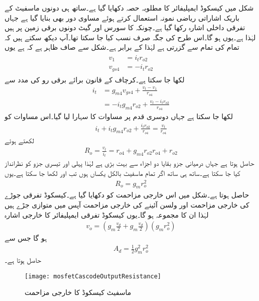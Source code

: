 شکل  میں کیسکوڈ ایمپلیفائر کا مطلوبہ حصہ دکھایا گیا ہے۔ساتھ ہی دونوں ماسفیٹ کے باریک اشاراتی ریاضی نمونہ استعمال کرتے ہوئے مساوی دور بھی بنایا گیا ہے جہاں تفرقی داخلی اشارہ  رکھا گیا ہے۔چونکہ  کا سورس اور گیٹ دونوں برقی زمین پر ہیں لہٰذا  ہے۔یوں  ہو گا۔اس طرح  کی جگہ صرف  نسب کیا جا سکتا تھا۔آپ دیکھ سکتے ہیں کہ  تمام کی تمام  سے گزرتی ہے لہٰذا  کے برابر ہے۔شکل سے صاف ظاہر ہے کہ  ہے یوں
\begin{gather}
\begin{aligned}\label{مساوات_تفرقی_ماسفیٹ_کیسکوڈ_خارجی_مزاحمت}
v_1&=i_t r_{o2}\\
v_{gs4}&=-i_t r_{o2}
\end{aligned}
\end{gather}
لکھا جا سکتا ہے۔کرچاف کے قانون برائے برقی رو کی مدد سے
\begin{align*}
i_t&=g_{m4} v_{gs4}+\frac{v_t-v_1}{r_{o4}}\\
&=-i_t g_{m4} r_{o2}+\frac{v_t-i_t r_{o2}}{r_{o4}}
\end{align*}
لکھا جا سکتا ہے جہاں دوسری قدم پر مساوات  کا سہارا لیا گیا۔اس مساوات کو
\begin{align*}
i_t+i_t g_{m4} r_{o2}+\frac{i_t r_{o2}}{r_{o4}}=\frac{v_t}{r_{o4}}
\end{align*}
لکھتے ہوئے
\begin{align}
R_o=\frac{v_t}{i_t}=r_{o4}+g_{m4} r_{o2} r_{o4}+r_{o2}
\end{align}
حاصل ہوتا ہے جہاں درمیانی جزو بقایا دو اجزاء سے بہت بڑی ہے لہٰذا پہلی اور تیسری جزو کو نظرانداز کیا جا سکتا ہے۔ساتھ ہی ساتھ اگر تمام ماسفیٹ بالکل یکساں ہوں تب  اور  لکھا جا سکتا ہے۔یوں
\begin{align}
R_o=g_{m} r_o^2
\end{align}
حاصل ہوتا ہے۔شکل  میں اس خارجی مزاحمت کو دکھایا گیا ہے۔کیسکوڈ تفرقی جوڑے کی خارجی مزاحمت اور ولسن آئینے کی خارجی مزاحمت آپس میں متوازی جڑے ہیں لہٰذا ان کا مجموعہ  ہو گا۔یوں کیسکوڈ  تفرقی ایمپلیفائر کا خارجی اشارہ
\begin{align*}
v_o =\left(g_m \frac{v_d}{2}+ g_m \frac{v_d}{2}\right) \left(g_m r_o^2 \right)
\end{align*} 
ہو گا جس سے
\begin{align}
A_d=\frac{1}{2} g_m^2 r_o^2
\end{align}
حاصل ہوتا ہے۔
\begin{figure}
\centering
\texttt{[image: mosfetCascodeOutputResistance]}
\caption{ماسفیٹ کیسکوڈ  کا خارجی مزاحمت}
\label{شکل_تفرقی_ماسفیٹ_کیسکوڈ_مزاحمت}
\end{figure}

